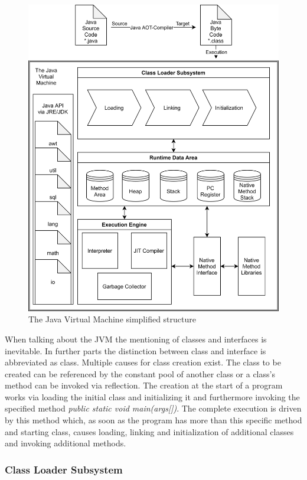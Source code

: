 \begin{figure}[h]
    \centering
	\includegraphics[scale=0.8]{figures/JVM.png}
	\caption{The Java Virtual Machine simplified structure}
	\label{fig:jvm}
\end{figure}

When talking about the JVM the mentioning of classes and interfaces is inevitable.
In further parts the distinction between class and interface is abbreviated as class.
Multiple causes for class creation exist. The class to be created can be referenced by the constant pool of another class or a class's method can be invoked via reflection.
The creation at the start of a program works via loading the initial class and initializing it and furthermore invoking the specified method \emph{public static void main(args[])}. The complete execution is driven by this method which, as soon as the program has more than this specific method and starting class, causes loading, linking and initialization of additional classes and invoking additional methods. \cite{Lindholm}

\subsubsection{Class Loader Subsystem}

